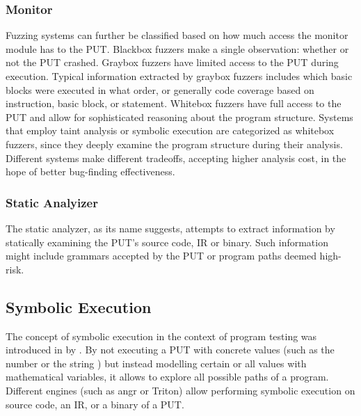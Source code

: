 \documentclass{article}
\begin{document}
\begin{multicols}{2}
    \subsubsection{Monitor}
    Fuzzing systems can further be classified based on how much access the monitor module has to the PUT. Blackbox fuzzers make a single observation: whether or not the PUT crashed. Graybox fuzzers have limited access to the PUT during execution. Typical information extracted by graybox fuzzers includes which basic blocks were executed in what order, or generally code coverage based on instruction, basic block, or statement. Whitebox fuzzers have full access to the PUT and allow for sophisticated reasoning about the program structure. Systems that employ taint analysis or symbolic execution are categorized as whitebox fuzzers, since they deeply examine the program structure during their analysis. Different systems make different tradeoffs, accepting higher analysis cost, in the hope of better bug-finding effectiveness.\cite{EvaluatingFuzzTesting}

    \subsubsection{Static Analyizer}
    The static analyzer, as its name suggests, attempts to extract information by statically examining the PUT's source code, IR or binary. Such information might include grammars accepted by the PUT or program paths deemed high-risk.

    \subsection{Symbolic Execution}
    The concept of symbolic execution in the context of program testing was introduced in \citeyear{Symbex} by \citeauthor{Symbex}.\cite{Symbex} By not executing a PUT with concrete values (such as the number  or the string ) but instead modelling certain or all values with mathematical variables, it allows to explore all possible paths of a program. Different engines (such as angr\cite{angr} or Triton\cite{Triton}) allow performing symbolic execution on source code, an IR, or a binary of a PUT.


\end{multicols}
\end{document}
